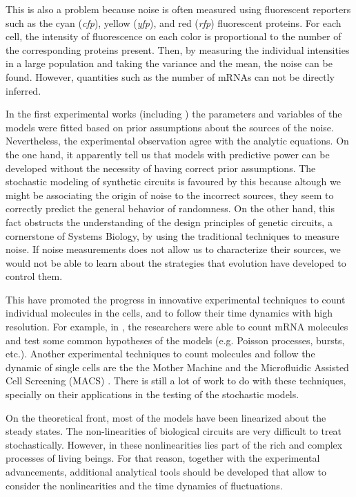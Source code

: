 This is also a problem because noise is often measured using fluorescent reporters such as the cyan (\textit{cfp}), yellow (\textit{yfp}), and red (\textit{rfp}) fluorescent proteins. For each cell, the intensity of fluorescence on each color is proportional to the number of the corresponding proteins present. Then, by measuring the individual intensities in a large population and taking the variance and the mean, the noise can be found. However, quantities such as the number of mRNAs can not be directly inferred.

In the first experimental works (including \cite{pedraza05}) the parameters and variables of the models were fitted based on prior assumptions about the sources of the noise. Nevertheless, the experimental observation agree with the analytic equations. On the one hand, it apparently tell us that models with predictive power can be developed without the necessity of having correct prior assumptions. The stochastic modeling of synthetic circuits is favoured by this because altough we might be associating the origin of noise to the incorrect sources, they seem to correctly predict the general behavior of randomness. On the other hand, this fact obstructs the understanding of the design principles of genetic circuits, a cornerstone of Systems Biology, by using the traditional techniques to measure noise. If noise measurements does not allow us to characterize their sources, we would not be able to learn about the strategies that evolution have developed to control them.

This have promoted the progress in innovative experimental techniques to count individual molecules in the cells, and to follow their time dynamics with high resolution. For example, in \cite{golding05}, the researchers were able to count mRNA molecules and test some common hypotheses of the models (e.g. Poisson processes, bursts, etc.). Another experimental techniques to count molecules and follow the dynamic of single cells are the the Mother Machine \cite{wang10} and the Microfluidic Assisted Cell Screening (MACS) \cite{okumus13}. There is still a lot of work to do with these techniques, specially on their applications in the testing of the stochastic models.

On the theoretical front, most of the models have been linearized about the steady states. The non-linearities of biological circuits are very difficult to treat stochastically. However, in these nonlinearities lies part of the rich and complex processes of living beings. For that reason, together with the experimental advancements, additional analytical tools should be developed that allow to consider the nonlinearities and the time dynamics of fluctuations.

